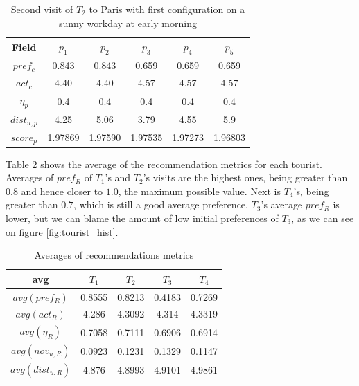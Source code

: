 \begin{table}[h!]
    \centering
    \begin{tabular}{ |c|c|c|c|c|c| } 
        \hline
        Field   & $p_1$ & $p_2$ & $p_3$ & $p_4$ & $p_5$ \\
        \hline
        $pref_c$    &  0.843 & 0.843 & 0.659 & 0.659 & 0.659 \\
        $act_c$     & 4.40 & 4.40 & 4.57 & 4.57 & 4.57  \\
        $\eta_p$    & 0.4 & 0.4 & 0.4 & 0.4 & 0.4 \\
        $dist_{u,p}$ & 4.25 & 5.06 & 3.79 & 4.55 & 5.9 \\
        $score_p$    & 1.97869 & 1.97590 & 1.97535 & 1.97273 & 1.96803 \\
        
        \hline
    \end{tabular}
    \caption{Second visit of $T_2$ to Paris with first configuration on a sunny workday at early morning}
    \label{table:t2-4}
\end{table}

Table \ref{table:config-1} shows the average of the recommendation metrics for each tourist. Averages of $pref_R$ of $T_1$'s and $T_2$'s visits are the highest ones, being greater than $0.8$ and hence closer to $1.0$, the maximum possible value. Next is $T_4$'s, being greater than $0.7$, which is still a good average preference. $T_3$'s average $pref_R$ is lower, but we can blame the amount of low initial preferences of $T_3$, as we can see on figure \ref{fig:tourist_hist}.
\begin{table}[h!]
    \centering
    \begin{tabular}{ |c|c|c|c|c| } 
        \hline
        avg & $T_1$ & $T_2$ & $T_3$ & $T_4$ \\
        \hline
        \hline
        $avg(pref_R)$ & 0.8555 & 0.8213 & 0.4183 & 0.7269\\
        $avg(act_R)$ & 4.286 & 4.3092 & 4.314 & 4.3319 \\
        $avg(\eta_R)$ & 0.7058 & 0.7111 & 0.6906 & 0.6914 \\
        $avg(nov_{u,R})$ & 0.0923 & 0.1231 & 0.1329 & 0.1147 \\
        $avg(dist_{u,R})$ & 4.876 & 4.8993 & 4.9101 & 4.9861 \\
       
        \hline
    \end{tabular}
    \caption{Averages of recommendations metrics}
    \label{table:config-1}
\end{table}

